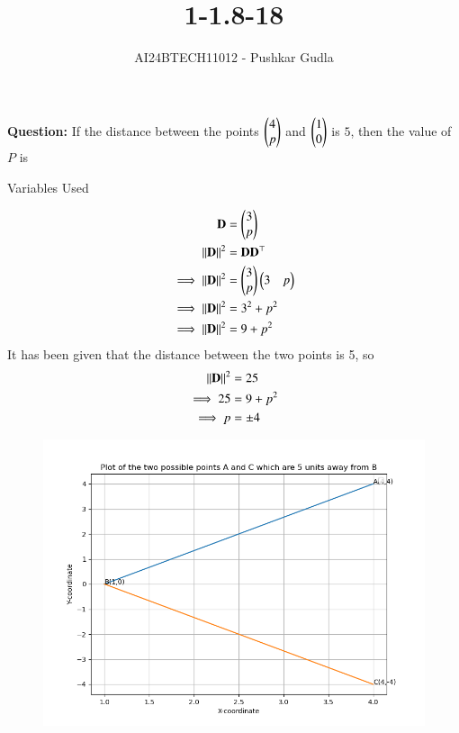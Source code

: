 \documentclass[journal]{IEEEtran}
\begin{document}

\vspace{3cm}

\title{1-1.8-18}
\author{AI24BTECH11012 - Pushkar Gudla}
{\let\newpage\relax\maketitle}

\renewcommand{\thefigure}{\theenumi}
\renewcommand{\thetable}{\theenumi}
\setlength{\intextsep}{10pt} %


\renewcommand{\thetable}{\theenumi}
\textbf{Question:} If the distance between the points $\begin{pmatrix}4\\p\end{pmatrix}$ and $\begin{pmatrix}1\\0\end{pmatrix}$ is $5$, then the value of $P$ is
\solution
\begin{table}[h!]    
  \centering
  
  \caption{Variables Used}
  \label{tab10.5.3.9.1}
\end{table}
\begin{align}
	\mathbf{D}	&= \begin{pmatrix}3\\p\end{pmatrix} \\
	\left\lVert\mathbf{D}\right\rVert^2 &= \mathbf{D}\mathbf{D}^\top \\
	\implies \left\lVert\mathbf{D}\right\rVert^2 &= \begin{pmatrix}3\\p\end{pmatrix}\begin{pmatrix}3 & p\end{pmatrix} \\
	\implies \left\lVert\mathbf{D}\right\rVert^2 &= 3^2 + p^2 \\
	\implies \left\lVert\mathbf{D}\right\rVert^2 &= 9 + p^2 \\
\end{align}
It has been given that the distance between the two points is 5, so \\
\begin{align}
	\left\lVert\mathbf{D}\right\rVert^2 &= 25 \\
	\implies 25 &= 9 + p^2 \\
	\implies p &= \pm 4
\end{align}
\begin{figure}[h]
	\centering
	\includegraphics[scale=0.6]{figs/plot.png}
	\label{Fig}
\end{figure}
\end{document}
